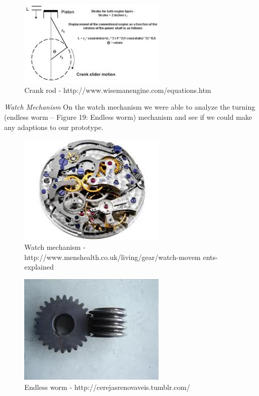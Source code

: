 \begin{figure}[h]
\centering
\includegraphics[width=7cm]{brazil_images/image019.jpg}
\caption{Crank rod - http://www.wisemanengine.com/equations.htm}
\label{fig:crank_rod}
\end{figure}


\emph{Watch Mechanism} On the watch mechanism we were able to analyze the turning (endless worm – Figure 19: Endless worm) mechanism and see if we could make any adaptions to our prototype.

\begin{figure}[h]
\centering
\includegraphics[width=7cm]{brazil_images/image020.jpg}
\caption{Watch mechanism - http://www.menshealth.co.uk/living/gear/watch-movem
ents-explained}
\label{fig:watch_mechanism}
\end{figure}


\begin{figure}[h]
\centering
\includegraphics[width=7cm]{brazil_images/image021.jpg}
\caption{Endless worm - http://cerejasrenovaveis.tumblr.com/}
\label{fig:endless_worm}
\end{figure}

